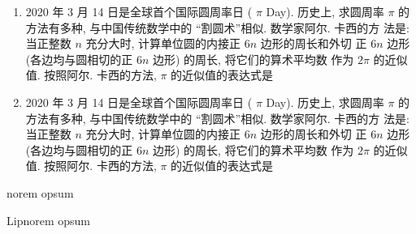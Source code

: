 \documentclass{ctexart}
\begin{document}
  \begin{enumerate}
    \item 
      2020 年 3 月 14 日是全球首个国际圆周率日 ( $\pi$ Day). 历史上, 求圆周率 $\pi$ 的方法有多种, 与中国传统数学中的 “割圆术”相似. 数学家阿尔. 卡西的方 法是: 当正整数 $n$ 充分大时, 计算单位圆的内接正 $6 n$ 边形的周长和外切 正 $6 n$ 边形 (各边均与圆相切的正 $6 n$ 边形) 的周长, 将它们的算术平均数 作为 $2 \pi$ 的近似值. 按照阿尔. 卡西的方法, $\pi$ 的近似值的表达式是 \xparen
    \item
      2020 年 3 月 14 日是全球首个国际圆周率日 ( $\pi$ Day). 历史上, 求圆周率 $\pi$ 的方法有多种, 与中国传统数学中的 “割圆术”相似. 数学家阿尔. 卡西的方 法是: 当正整数 $n$ 充分大时, 计算单位圆的内接正 $6 n$ 边形的周长和外切 正 $6 n$ 边形 (各边均与圆相切的正 $6 n$ 边形) 的周长, 将它们的算术平均数 作为 $2 \pi$ 的近似值. 按照阿尔. 卡西的方法, $\pi$ 的近似值的表达式是 \xparen
  \end{enumerate}

  \begin{xchoices}
    \item norem opsum
    \item Lipnorem opsum
  \end{xchoices}
\end{document}
